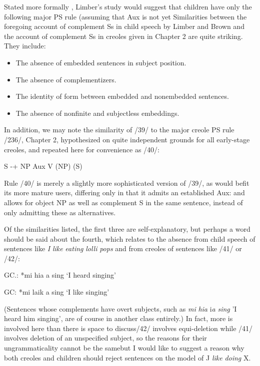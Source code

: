 Stated more formally , Limber's study would suggest that children have only the following major PS rule (assuming that Aux is not yet
Similarities between the foregoing account of complement Ss in child speech by Limber and Brown and the account of complement Ss in creoles given in Chapter 2 are quite striking. They include:

\begin{itemize}
\item The absence of embedded sentences in subject position.
\item The absence of complementizers.
\item  The identity of form between embedded and nonembedded sentences.
\item  The absence of nonfinite and subjectless embeddings.
\end{itemize}
 
In addition, we may note the similarity of /39/ to the major creole PS rule /236/, Chapter 2, hypothesized on quite independent grounds for all early-stage creoles, and repeated here for convenience as /40/:

\ea\label{ex:40}
 S -+ NP Aux V (NP) (S) 
\z

Rule /40/ is merely a slightly more sophisticated version of /39/, as would befit its more mature users, differing only in that it admits an established Aux: and allows for object NP as well as complement S in the same sentence, instead of only admitting these as alternatives.

Of the similarities listed, the first three are self-explanatory, but perhaps a word should be said about the fourth, which relates to the absence from child speech of sentences like \textit{I} \textit{like} \textit{eating} \textit{lolli\-} \textit{pops} and from creoles of sentences like /41/ or /42/:

\ea\label{ex:41}
 GC.: *mi hia a sing
\glt `I heard singing'
\z




\ea\label{ex:42}
 GC: *mi laik a sing
\glt `I like singing'
\z



(Sentences whose complements have overt subjects, such as \textit{mi} \textit{hia} i\textit{a} \textit{si}\textit{n}\textit{g} 'I heard him singing', are of course in another class entirely.) In fact, more is involved here than there is space to discuss/42/ involves equi-deletion while /41/ involves deletion of an unspecified subject, so the reasons for their ungrammaticality cannot be the samebut I would like to suggest a reason why both creoles and children should reject sentences on the model of J \textit{like} \textit{doing} X.

